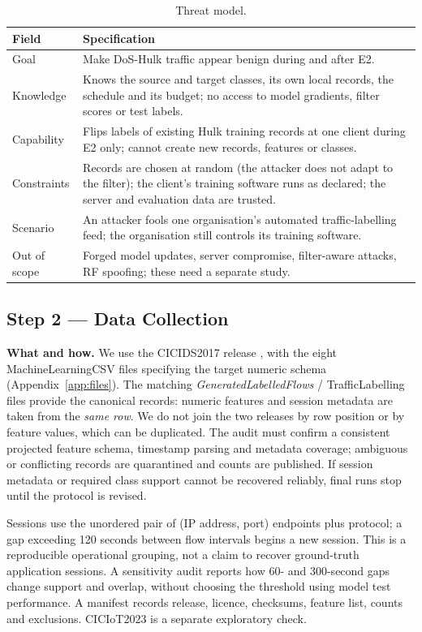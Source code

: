 \documentclass[10pt,a4paper]{article}
\begin{document}
\begin{table}[H]
\centering\footnotesize
\caption{Threat model.}
\label{tab:threat}
\begin{tabularx}{\linewidth}{L{2.2cm}Y}
\toprule
Field & Specification\\
\midrule
Goal & Make DoS-Hulk traffic appear benign during and after E2.\\
Knowledge & Knows the source and target classes, its own local records, the schedule and its budget; no access to model gradients, filter scores or test labels.\\
Capability & Flips labels of existing Hulk training records at one client during E2 only; cannot create new records, features or classes.\\
Constraints & Records are chosen at random (the attacker does not adapt to the filter); the client's training software runs as declared; the server and evaluation data are trusted.\\
Scenario & An attacker fools one organisation's automated traffic-labelling feed; the organisation still controls its training software.\\
Out of scope & Forged model updates, server compromise, filter-aware attacks, RF spoofing; these need a separate study.\\
\bottomrule
\end{tabularx}
\end{table}

\subsection{Step 2 --- Data Collection}
\textbf{What and how.} We use the CICIDS2017 release \cite{dataset}, with the eight MachineLearningCSV files specifying the target numeric schema (Appendix~\ref{app:files}). The matching \emph{GeneratedLabelledFlows} / TrafficLabelling files provide the canonical records: numeric features and session metadata are taken from the \emph{same row}. We do not join the two releases by row position or by feature values, which can be duplicated. The audit must confirm a consistent projected feature schema, timestamp parsing and metadata coverage; ambiguous or conflicting records are quarantined and counts are published. If session metadata or required class support cannot be recovered reliably, final runs stop until the protocol is revised.

Sessions use the unordered pair of (IP address, port) endpoints plus protocol; a gap exceeding 120 seconds between flow intervals begins a new session. This is a reproducible operational grouping, not a claim to recover ground-truth application sessions. A sensitivity audit reports how 60- and 300-second gaps change support and overlap, without choosing the threshold using model test performance. A manifest records release, licence, checksums, feature list, counts and exclusions. CICIoT2023 \cite{iot} is a separate exploratory check.
\end{document}
